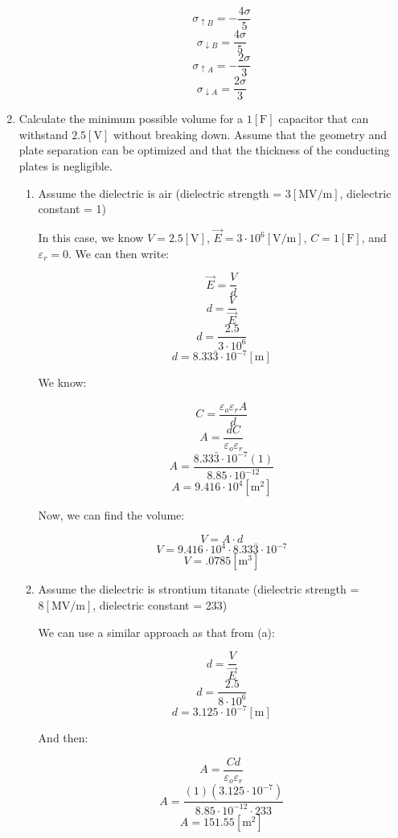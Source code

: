 \begin{enumerate}
\begin{enumerate}
        $$\boxed{\sigma_{\uparrow B}=-\frac{4\sigma}{5}}$$
        $$\boxed{\sigma_{\downarrow B}=\frac{4\sigma}{5}}$$
        $$\boxed{\sigma_{\uparrow A}=-\frac{2\sigma}{3}}$$
        $$\boxed{\sigma_{\downarrow A}=\frac{2\sigma}{3}}$$

    \end{enumerate}

  \item Calculate the minimum possible volume for a $1[\si{\farad}]$ capacitor that can withstand $2.5[\si{\volt}]$ without breaking down. Assume that the geometry and plate separation can be optimized and that the thickness of the conducting plates is negligible.

    \begin{enumerate}

      \item Assume the dielectric is air (dielectric strength = $3[\si{\mega\volt}/\si{\meter}]$, dielectric constant = 1)

        In this case, we know $V=2.5[\si{\volt}]$, $\vec{E}=3\cdot10^6[\si{\volt}/\si{\meter}]$, $C=1[\si{\farad}]$, and $\varepsilon_r=0$. We can then write:

        $$\vec{E}=\frac{V}{d}$$
        $$d=\frac{V}{\vec{E}}$$
        $$d=\frac{2.5}{3\cdot10^{6}}$$
        $$d=8.33\bar{3}\cdot10^{-7}[\si{\meter}]$$

        We know:

        $$C=\frac{\varepsilon_o\varepsilon_r A}{d}$$
        $$A=\frac{d C}{\varepsilon_o\varepsilon_r}$$
        $$A=\frac{8.33\bar{3}\cdot10^{-7}(1)}{8.85\cdot10^{-12}}$$
        $$A=9.416\cdot10^4[\si{\meter\squared}]$$

        Now, we can find the volume:

        $$V=A\cdot d$$
        $$V=9.416\cdot10^4\cdot 8.33\bar{3}\cdot10^{-7}$$
        $$\boxed{V=.0785[\si{\meter\cubed}]}$$

      \item Assume the dielectric is strontium titanate (dielectric strength = $8[\si{\mega\volt}/\si{\meter}]$, dielectric constant = 233)

        We can use a similar approach as that from (a):

        $$d=\frac{V}{\vec{E}}$$
        $$d=\frac{2.5}{8\cdot10^6}$$
        $$d=3.125\cdot10^{-7}[\si{\meter}]$$

        And then:

        $$A=\frac{Cd}{\varepsilon_o\varepsilon_r}$$
        $$A=\frac{(1)(3.125\cdot10^{-7})}{8.85\cdot10^{-12}\cdot233}$$
        $$A=151.55[\si{\meter\squared}]$$


\end{enumerate}
\end{enumerate}
